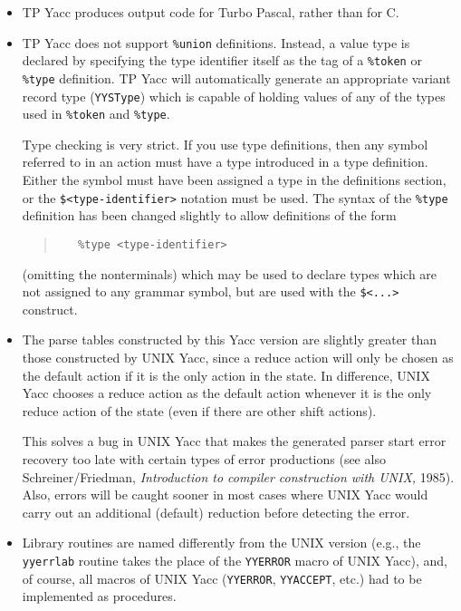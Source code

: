 \begin{itemize}
   \item
      TP Yacc produces output code for Turbo Pascal, rather than for C.
   \item
      TP Yacc does not support \verb"%union" definitions. Instead, a value
      type is declared by specifying the type identifier itself as the tag of
      a \verb"%token" or \verb"%type" definition. TP Yacc will automatically
      generate an appropriate variant record type (\verb"YYSType") which is
      capable of holding values of any of the types used in \verb"%token" and
      \verb"%type".
    
      Type checking is very strict. If you use type definitions, then
      any symbol referred to in an action must have a type introduced
      in a type definition. Either the symbol must have been assigned a
      type in the definitions section, or the \verb"$<type-identifier>"
      notation must be used. The syntax of the \verb"%type" definition has
      been changed slightly to allow definitions of the form
      \begin{quote}\begin{verbatim}
   %type <type-identifier>
      \end{verbatim}\end{quote}
      (omitting the nonterminals) which may be used to declare types which
      are not assigned to any grammar symbol, but are used with the
      \verb"$<...>" construct.
   \item
      The parse tables constructed by this Yacc version are slightly greater
      than those constructed by UNIX Yacc, since a reduce action will only be
      chosen as the default action if it is the only action in the state.
      In difference, UNIX Yacc chooses a reduce action as the default action
      whenever it is the only reduce action of the state (even if there are
      other shift actions).
    
      This solves a bug in UNIX Yacc that makes the generated parser start
      error recovery too late with certain types of error productions (see
      also Schreiner/Friedman, {\em Introduction to compiler construction with
      UNIX,\/} 1985). Also, errors will be caught sooner in most cases where
      UNIX Yacc would carry out an additional (default) reduction before
      detecting the error.
   \item
      Library routines are named differently from the UNIX version (e.g.,
      the \verb"yyerrlab" routine takes the place of the \verb"YYERROR"
      macro of UNIX Yacc), and, of course, all macros of UNIX Yacc
      (\verb"YYERROR", \verb"YYACCEPT", etc.) had to be implemented as
      procedures.
\end{itemize}


